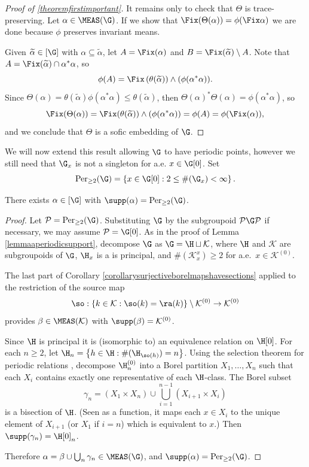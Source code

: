\begin{proof}[Proof of \ref{theoremfirstimportant}]
It remains only to check that $\Theta$ is trace-preserving. Let $\alpha\in\MEAS(\G)$. If we show that $\Fix(\Theta(\alpha))=\phi(\Fix\alpha)$ we are done because $\phi$ preserves invariant means.

Given $\widetilde{\alpha}\in[\G]$ with $\alpha\subseteq\widetilde{\alpha}$, let $A=\Fix(\alpha)$ and $B=\Fix(\widetilde{\alpha})\setminus A$. Note that $A=\Fix(\widetilde{\alpha})\cap\alpha^*\alpha$, so
\[\phi(A)=\Fix\left(\theta(\widetilde{\alpha})\right)\land (\phi(\alpha^*\alpha)).\]
Since $\Theta(\alpha)=\theta(\widetilde{\alpha})\phi(\alpha^*\alpha)\leq\theta(\widetilde{\alpha})$, then $\Theta(\alpha)^*\Theta(\alpha)=\phi(\alpha^*\alpha)$, so
\[\Fix(\Theta(\alpha))=\Fix(\theta(\widetilde{\alpha}))\land (\phi(\alpha^*\alpha))=\phi(A)=\phi(\Fix(\alpha)),\]
and we conclude that $\Theta$ is a sofic embedding of $\G$.\qedhere
\end{proof}

We will now extend this result allowing $\G$ to have periodic points, however we still need that $\G_x$ is not a singleton for a.e. $x\in\G[0]$. Set
\[\operatorname{Per}_{\geq 2}(\G)=\left\{x\in \G[0]:2\leq\#(\G_x)<\infty\right\}.\]

\begin{lemma}
There exists $\alpha\in[\G]$ with $\supp(\alpha)=\operatorname{Per}_{\geq 2}(\G)$.
\end{lemma}
\begin{proof}
Let $\mathcal{P}=\operatorname{Per}_{\geq 2}(\G)$. Substituting $\G$ by the subgroupoid $\mathcal{P}\G\mathcal{P}$ if necessary, we may assume $\mathcal{P}=\G[0]$. As in the proof of Lemma \ref{lemmaaperiodicsupport}, decompose $\G$ as $\G=\H\sqcup \mathcal{K}$, where $\H$ and $\mathcal{K}$ are subgroupoids of $\G$, $\H_x$ is a  is principal, and $\#(\mathcal{K}^x_x)\geq 2$ for a.e.\ $x\in\mathcal{K}^{(0)}$.

The last part of Corollary \ref{corollarysurjectiveborelmapshavesections} applied to the restriction of the source map
\[\so:\left\{k\in\mathcal{K}:\so(k)=\ra(k)\right\}\setminus\mathcal{K}^{(0)}\to\mathcal{K}^{(0)}\]
provides $\beta\in\MEAS(\mathcal{K})$ with $\supp(\beta)=\mathcal{K}^{(0)}$.

Since $\H$ is principal it is (isomorphic to) an equivalence relation on $\H[0]$. For each $n\geq 2$, let $\H_n=\left\{h\in\H:\#(\H_{\so(h)})=n\right\}$. Using the selection theorem for periodic relations \cite[Theorem 12.16]{MR1321597}, decompose $\H_n^{(0)}$ into a Borel partition $X_1,\ldots,X_n$ such that each $X_i$ contains exactly one representative of each $\H$-class. The Borel subset
\[\gamma_n=(X_1\times X_n)\cup \bigcup_{i=1}^{n-1}(X_{i+1}\times X_i)\]
is a bisection of $\H$. (Seen as a function, it maps each $x\in X_i$ to the unique element of $X_{i+1}$ (or $X_1$ if $i=n$) which is equivalent to $x$.) Then $\supp(\gamma_n)=\H[0]_n$.

Therefore $\alpha=\beta\cup\bigcup_n\gamma_n\in\MEAS(\G)$, and $\supp(\alpha)=\operatorname{Per}_{\geq 2}(\G)$.\qedhere
\end{proof}

